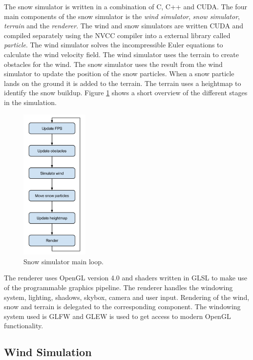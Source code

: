 The snow simulator is written in a combination of C, C++ and CUDA.
The four main components of the snow simulator is the \emph{wind simulator}, 
\emph{snow simulator}, \emph{terrain} and the \emph{renderer}. The wind and 
snow simulators are written CUDA and compiled separately using the NVCC compiler 
into a external library called \emph{particle}. The wind simulator 
solves the incompressible Euler equations to calculate the wind velocity field. 
The wind simulator uses the terrain to create obstacles for the wind. The snow 
simulator uses the result from the wind simulator to update the position of the 
snow particles. When a snow particle lands on the ground it is added to the terrain.
The terrain uses a heightmap to identify the snow buildup. Figure \ref{fig:mainLoop} 
shows a short overview of the different stages in the simulation. 

\begin{figure}[ht]
	\center
	\includegraphics[width=0.30\textwidth]{images/snow_sim_main_loop}
	\caption{Snow simulator main loop.}
	\label{fig:mainLoop}
\end{figure}

The renderer uses OpenGL version 4.0 and shaders written in GLSL to make use of 
the programmable graphics pipeline. The renderer handles the windowing system, 
lighting, shadows, skybox, camera and user input. Rendering of the wind, snow and 
terrain is delegated to the corresponding component. The windowing system used 
is GLFW and GLEW is used to get access to modern OpenGL functionality. 

\subsection{Wind Simulation}

